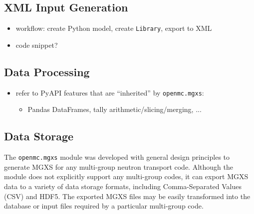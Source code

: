 \subsection{XML Input Generation}
\label{subsec:xml-inputs}

\begin{itemize}[noitemsep]
\item workflow: create Python model, create \texttt{Library}, export to XML
\item code snippet?
\end{itemize}

\subsection{Data Processing}
\label{subsec:xml-inputs}

\begin{itemize}[noitemsep]
\item refer to PyAPI features that are ``inherited'' by \texttt{openmc.mgxs}:
  \begin{itemize}[noitemsep]
  \item Pandas DataFrames, tally arithmetic/slicing/merging, ...
  \end{itemize}
\end{itemize}

\subsection{Data Storage}
\label{subsec:xml-inputs}

The \texttt{openmc.mgxs} module was developed with general design principles to generate MGXS for any multi-group neutron transport code. Although the module does not explicitly support any multi-group codes, it can export MGXS data to a variety of data storage formats, including Comma-Separated Values (CSV) and HDF5. The exported MGXS files may be easily transformed into the database or input files required by a particular multi-group code.